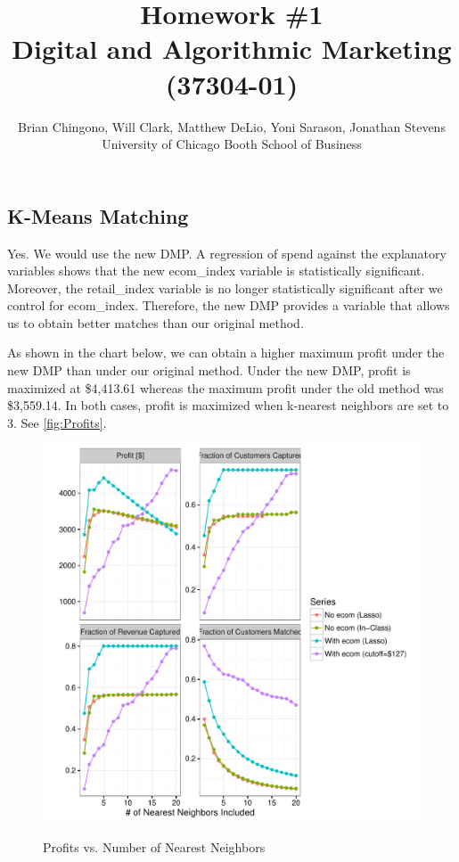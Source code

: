



\title{Homework \#1\\
Digital and Algorithmic Marketing (37304-01)}
\author{Brian Chingono, Will Clark, Matthew DeLio, Yoni Sarason, Jonathan Stevens\\
University of Chicago Booth School of Business}

\maketitle

\section{} %

\subsection{K-Means Matching}

Yes. We would use the new DMP. A regression of spend against the explanatory variables shows that the new ecom\_index variable is statistically significant. Moreover, the retail\_index variable is no longer statistically significant after we control for ecom\_index. Therefore, the new DMP provides a variable that allows us to obtain better matches than our original method.

As shown in the chart below, we can obtain a higher maximum profit under the new DMP than under our original method. Under the new DMP, profit is maximized at \$4,413.61 whereas the maximum profit under the old method was \$3,559.14. In both cases, profit is maximized when k-nearest neighbors are set to 3. See \vref{fig:Profits}.

\begin{figure}[!htb]
  \centering
  \caption{Profits vs. Number of Nearest Neighbors}
  \includegraphics[scale=.5]{Profits.pdf}
  \label{fig:Profits}
\end{figure}

